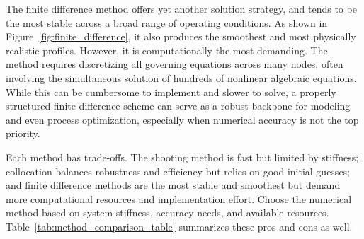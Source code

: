 \documentclass[a4paper,fleqn]{cas-sc}
\begin{document}
    The finite difference method offers yet another solution strategy, and tends to be the most stable across a broad range of operating conditions. As shown in Figure~\ref{fig:finite_difference}, it also produces the smoothest and most physically realistic profiles. However, it is computationally the most demanding. The method requires discretizing all governing equations across many nodes, often involving the simultaneous solution of hundreds of nonlinear algebraic equations. While this can be cumbersome to implement and slower to solve, a properly structured finite difference scheme can serve as a robust backbone for modeling and even process optimization, especially when numerical accuracy is not the top priority.

    Each method has trade-offs. The shooting method is fast but limited by stiffness; collocation balances robustness and efficiency but relies on good initial guesses; and finite difference methods are the most stable and smoothest but demand more computational resources and implementation effort. Choose the numerical method based on system stiffness, accuracy needs, and available resources. Table~\ref{tab:method_comparison_table} summarizes these pros and cons as well.
\end{document}
